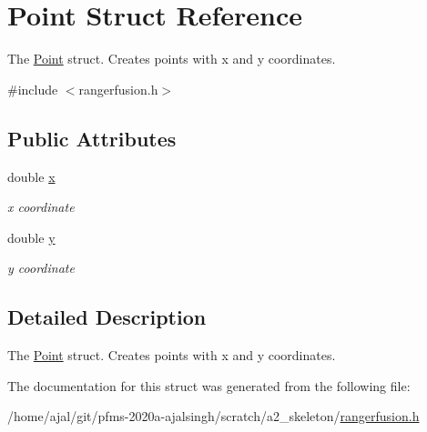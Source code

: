 \hypertarget{structPoint}{}\section{Point Struct Reference}
\label{structPoint}


The \hyperlink{structPoint}{Point} struct. Creates points with x and y coordinates.  




{\ttfamily \#include $<$rangerfusion.\+h$>$}

\subsection*{Public Attributes}
\begin{DoxyCompactItemize}
\item 
double \hyperlink{structPoint_ab99c56589bc8ad5fa5071387110a5bc7}{x}\hypertarget{structPoint_ab99c56589bc8ad5fa5071387110a5bc7}{}\label{structPoint_ab99c56589bc8ad5fa5071387110a5bc7}

\begin{DoxyCompactList}\small\item\em x coordinate \end{DoxyCompactList}\item 
double \hyperlink{structPoint_afa38be143ae800e6ad69ce8ed4df62d8}{y}\hypertarget{structPoint_afa38be143ae800e6ad69ce8ed4df62d8}{}\label{structPoint_afa38be143ae800e6ad69ce8ed4df62d8}

\begin{DoxyCompactList}\small\item\em y coordinate \end{DoxyCompactList}\end{DoxyCompactItemize}


\subsection{Detailed Description}
The \hyperlink{structPoint}{Point} struct. Creates points with x and y coordinates. 

The documentation for this struct was generated from the following file\+:\begin{DoxyCompactItemize}
\item 
/home/ajal/git/pfms-\/2020a-\/ajalsingh/scratch/a2\+\_\+skeleton/\hyperlink{rangerfusion_8h}{rangerfusion.\+h}\end{DoxyCompactItemize}
